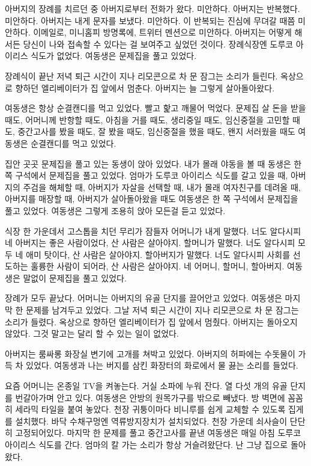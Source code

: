 \documentclass[a5paper,10pt, twoside, openright]{memoir}
\begin{document}
	아버지의 장례를 치르던 중 아버지로부터 전화가 왔다. 미안하다. 아버지는 반복했다. 미안하다. 아버지는 내게 문자를 보냈다. 미안하다. 이 반복되는 진심에 무뎌갈 때쯤 미안하다. 이메일로, 미니홈피 방명록에, 트위터 멘션으로 미안하다. 아버지는 어떻게 해서든 당신이 나와 접속할 수 있다는 걸 보여주고 싶었던 것이다. 장례식장엔 도루코 아이리스 식도가 없었다. 여동생은 문제집을 풀고 있었다.

	장례식이 끝난 저녁 퇴근 시간이 지나 리모콘으로 차 문 잠그는 소리가 들린다. 옥상으로 향하던 엘리베이터가 집 앞에서 멈춘다. 아버지는 늘 그렇게 살아돌아왔다.

	여동생은 항상 순결캔디를 먹고 있었다. 빨고 핥고 깨물어 먹었다. 문제집 살 돈을 받을 때도, 어머니께 반항할 때도, 아침을 거를 때도, 생리중일 때도, 임신중절을 고민할 때도, 중간고사를 봤을 때도, 잘 봤을 때도, 임신중절을 했을 때도, 왠지 서러웠을 때도 여동생은 순결캔디를 먹고 있었다.

	집안 곳곳 문제집을 풀고 있는 동생이 앉아 있었다. 내가 몰래 야동을 볼 때 동생은 한 쪽 구석에서 문제집을 풀고 있었다. 엄마가 도루코 아이리스 식도를 갈고 있을 때, 아버지의 주검을 해체할 때, 아버지가 자살을 선택할 때, 내가 몰래 여자친구를 데려올 때, 아버지를 매장할 때, 아버지가 살아돌아왔을 때도 여동생은 한 쪽 구석에서 문제집을 풀고 있었다. 여동생은 그렇게 조용히 앉아 모든걸 듣고 있었다.

	식장 한 가운데서 고스톱을 치던 무리가 잠들자 어머니가 내게 말했다. 너도 알다시피 네 아버지는 좋은 사람이었다, 산 사람은 살아야지. 할머니가 말했다. 너도 알다시피 모두 네 애미 탓이다, 산 사람은 살아야지. 할아버지가 말했다. 너도 알다시피 사회를 선도하는 훌륭한 사람이 되어라, 산 사람은 살아야지. 네 어머니, 할머니, 할아버지. 여동생은 말없이 문제집을 풀고 있었다.

	장례가 모두 끝났다. 어머니는 아버지의 유골 단지를 끌어안고 있었다. 여동생은 마지막 한 문제를 남겨두고 있었다. 그날 저녁 퇴근 시간이 지나 리모콘으로 차 문 잠그는 소리가 들렸다. 옥상으로 향하던 엘리베이터가 집 앞에서 멈췄다. 아버지는 돌아오지 않았다. 그것 말고는 달리 할 수 있는 일이 없었다.

	아버지는 룸싸롱 화장실 변기에 고개를 쳐박고 있었다. 아버지의 허파에는 수돗물이 가득 차 있었다. 여동생과 나는 버지를 삼킨 화장터의 화로에서 물 끓는 소리를 들었다.

	요즘 어머니는 온종일 TV을 켜놓는다. 거실 소파에 누워 잔다. 열 다섯 개의 유골 단지를 번갈아가며 안고 있다. 여동생은 안방의 원목가구를 밖으로 빼냈다. 방 벽면에 꼼꼼히 세라믹 타일을 붙여 놓았다. 천장 귀퉁이마다 비니루를 쉽게 교체할 수 있도록 집게를 설치했다. 바닥 수채구멍엔 역류방지장치가 설치되었다. 천장 가운데 쇠사슬이 단단히 고정되어있다. 마지막 한 문제를 풀고 중간고사를 끝낸 여동생은 매일 아침 도루코 아이리스 식도를 간다. 엄마의 칼 가는 소리가 항상 거슬려왔단다. 난 그냥 집으로 돌아왔다.
\end{document}

